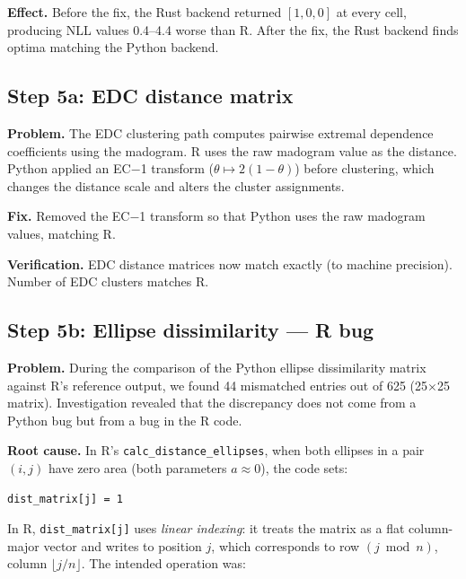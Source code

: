 \documentclass[12pt,a4paper]{article}
\begin{document}
\textbf{Effect.}
Before the fix, the Rust backend returned $[1, 0, 0]$ at every
cell, producing NLL values 0.4--4.4 worse than R.  After the fix,
the Rust backend finds optima matching the Python backend.

\subsection{Step 5a: EDC distance matrix}
\label{sec:fix-edc}

\textbf{Problem.}
The EDC clustering path computes pairwise extremal dependence
coefficients using the madogram.  R uses the raw madogram value
as the distance.  Python applied an EC$-$1 transform
($\theta \mapsto 2(1 - \theta)$) before clustering, which changes
the distance scale and alters the cluster assignments.

\textbf{Fix.}
Removed the EC$-$1 transform so that Python uses the raw madogram
values, matching R.

\textbf{Verification.}
EDC distance matrices now match exactly (to machine precision).
Number of EDC clusters matches R.

\subsection{Step 5b: Ellipse dissimilarity --- R bug}
\label{sec:fix-ellipse}

\textbf{Problem.}
During the comparison of the Python ellipse dissimilarity matrix
against R's reference output, we found 44 mismatched entries out of
625 (25$\times$25 matrix).  Investigation revealed that the
discrepancy does not come from a Python bug but from a bug in the
R code.

\textbf{Root cause.}
In R's \texttt{calc\_distance\_ellipses}, when both ellipses in a
pair $(i, j)$ have zero area (both parameters $a \approx 0$), the
code sets:

\begin{lstlisting}
dist_matrix[j] = 1
\end{lstlisting}

In R, \texttt{dist\_matrix[j]} uses \emph{linear indexing}:
it treats the matrix as a flat column-major vector and writes to
position $j$, which corresponds to row $(j \bmod n)$, column
$\lfloor j / n \rfloor$.  The intended operation was:
\end{document}
